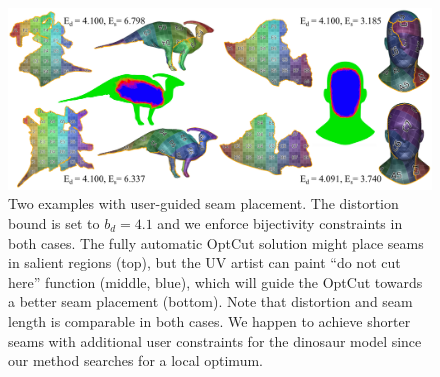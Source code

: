 \begin{figure}[t]
\centering
\includegraphics[width=\linewidth]{fig/regional_user.png}
\caption{Two examples with user-guided seam placement. The distortion bound is set to $b_d=4.1$ and we enforce bijectivity constraints in both cases. 
The fully automatic OptCut solution might place seams in salient regions (top), but the UV artist can paint ``do not cut here'' function (middle, blue), which will guide
the OptCut towards a better seam placement (bottom). Note that distortion and seam length is comparable in both cases. We happen to achieve shorter seams with additional user constraints for the dinosaur model since our method searches for a local optimum.}
\label{fig:regional_seam_placement}
\end{figure}


